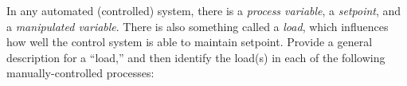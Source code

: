 











In any automated (controlled) system, there is a {\it process variable}, a {\it setpoint}, and a {\it manipulated variable}.  There is also something called a {\it load}, which influences how well the control system is able to maintain setpoint.  Provide a general description for a ``load,'' and then identify the load(s) in each of the following manually-controlled processes:

